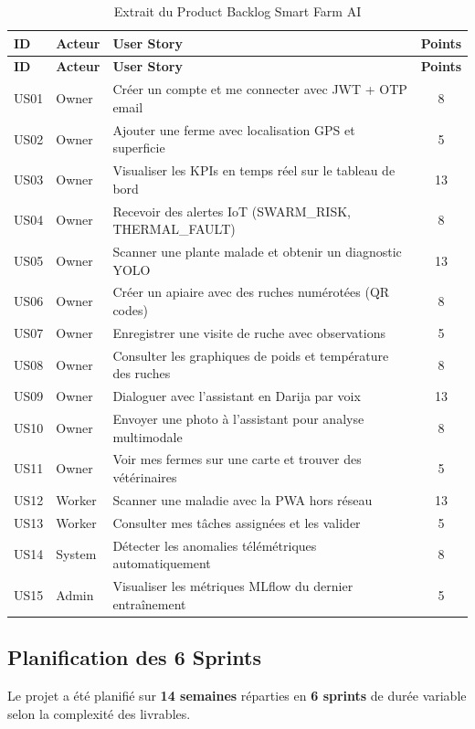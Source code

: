 \begin{longtable}{llp{5.5cm}c}
\caption{Extrait du Product Backlog Smart Farm AI} \label{tab:backlog} \\
\toprule
\textbf{ID} & \textbf{Acteur} & \textbf{User Story} & \textbf{Points} \\
\midrule
\endfirsthead
\toprule
\textbf{ID} & \textbf{Acteur} & \textbf{User Story} & \textbf{Points} \\
\midrule
\endhead
\bottomrule
\endfoot
US01 & Owner  & Créer un compte et me connecter avec JWT + OTP email & 8 \\
US02 & Owner  & Ajouter une ferme avec localisation GPS et superficie & 5 \\
US03 & Owner  & Visualiser les KPIs en temps réel sur le tableau de bord & 13 \\
US04 & Owner  & Recevoir des alertes IoT (SWARM\_RISK, THERMAL\_FAULT) & 8 \\
US05 & Owner  & Scanner une plante malade et obtenir un diagnostic YOLO & 13 \\
US06 & Owner  & Créer un apiaire avec des ruches numérotées (QR codes) & 8 \\
US07 & Owner  & Enregistrer une visite de ruche avec observations & 5 \\
US08 & Owner  & Consulter les graphiques de poids et température des ruches & 8 \\
US09 & Owner  & Dialoguer avec l'assistant en Darija par voix & 13 \\
US10 & Owner  & Envoyer une photo à l'assistant pour analyse multimodale & 8 \\
US11 & Owner  & Voir mes fermes sur une carte et trouver des vétérinaires & 5 \\
US12 & Worker & Scanner une maladie avec la PWA hors réseau & 13 \\
US13 & Worker & Consulter mes tâches assignées et les valider & 5 \\
US14 & System & Détecter les anomalies télémétriques automatiquement & 8 \\
US15 & Admin  & Visualiser les métriques MLflow du dernier entraînement & 5 \\
\bottomrule
\end{longtable}

\subsection{Planification des 6 Sprints}

Le projet a été planifié sur \textbf{14 semaines} réparties en \textbf{6 sprints}
de durée variable selon la complexité des livrables.

